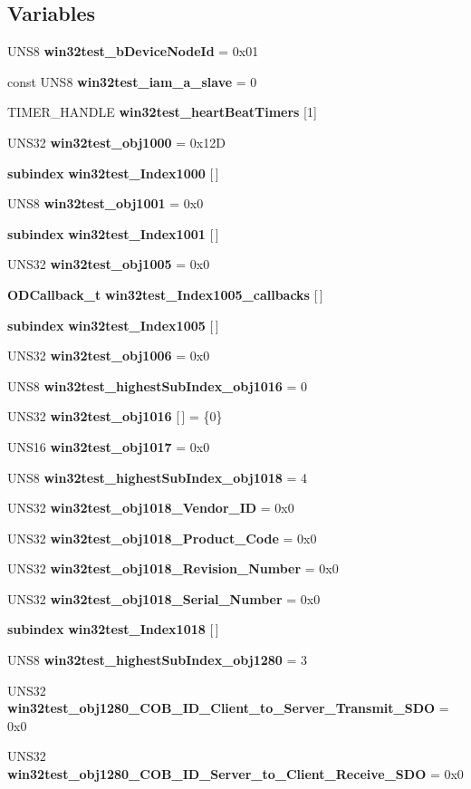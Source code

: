 \subsection*{Variables}
\begin{CompactItemize}
\item 
UNS8 {\bf win32test\_\-b\-Device\-Node\-Id} = 0x01
\item 
const UNS8 {\bf win32test\_\-iam\_\-a\_\-slave} = 0
\item 
TIMER\_\-HANDLE {\bf win32test\_\-heart\-Beat\-Timers} [1]
\item 
UNS32 {\bf win32test\_\-obj1000} = 0x12D
\item 
{\bf subindex} {\bf win32test\_\-Index1000} [$\,$]
\item 
UNS8 {\bf win32test\_\-obj1001} = 0x0
\item 
{\bf subindex} {\bf win32test\_\-Index1001} [$\,$]
\item 
UNS32 {\bf win32test\_\-obj1005} = 0x0
\item 
{\bf ODCallback\_\-t} {\bf win32test\_\-Index1005\_\-callbacks} [$\,$]
\item 
{\bf subindex} {\bf win32test\_\-Index1005} [$\,$]
\item 
UNS32 {\bf win32test\_\-obj1006} = 0x0
\item 
UNS8 {\bf win32test\_\-highest\-Sub\-Index\_\-obj1016} = 0
\item 
UNS32 {\bf win32test\_\-obj1016} [$\,$] = \{0\}
\item 
UNS16 {\bf win32test\_\-obj1017} = 0x0
\item 
UNS8 {\bf win32test\_\-highest\-Sub\-Index\_\-obj1018} = 4
\item 
UNS32 {\bf win32test\_\-obj1018\_\-Vendor\_\-ID} = 0x0
\item 
UNS32 {\bf win32test\_\-obj1018\_\-Product\_\-Code} = 0x0
\item 
UNS32 {\bf win32test\_\-obj1018\_\-Revision\_\-Number} = 0x0
\item 
UNS32 {\bf win32test\_\-obj1018\_\-Serial\_\-Number} = 0x0
\item 
{\bf subindex} {\bf win32test\_\-Index1018} [$\,$]
\item 
UNS8 {\bf win32test\_\-highest\-Sub\-Index\_\-obj1280} = 3
\item 
UNS32 {\bf win32test\_\-obj1280\_\-COB\_\-ID\_\-Client\_\-to\_\-Server\_\-Transmit\_\-SDO} = 0x0
\item 
UNS32 {\bf win32test\_\-obj1280\_\-COB\_\-ID\_\-Server\_\-to\_\-Client\_\-Receive\_\-SDO} = 0x0

\end{CompactItemize}

